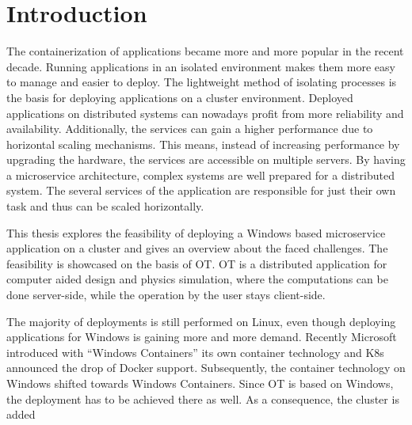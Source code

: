 


\chapter{Introduction} %

\label{chap:introd} %



The containerization of applications became more and more popular in the recent decade. Running applications in an isolated environment makes them more easy to manage and easier to deploy. The lightweight method of isolating processes is the basis for deploying applications on a cluster environment.
Deployed applications on distributed systems can nowadays profit from more reliability and availability. Additionally, the services can gain a higher performance due to horizontal scaling mechanisms. This means, instead of increasing performance by upgrading the hardware, the services are accessible on multiple servers.
By having a microservice architecture, complex systems are well prepared for a distributed system. The several services of the application are responsible for just their own task and thus can be scaled horizontally.

This thesis explores the feasibility of deploying a \ac{Windows} based microservice application on a cluster and gives an overview about the faced challenges. The feasibility is showcased on the basis of \ac{OT}. \ac{OT} is a distributed application for computer aided design and physics simulation, where the computations can be done server-side, while the operation by the user stays client-side.

The majority of deployments is still performed on Linux, even though deploying applications for \ac{Windows} is gaining more and more demand. Recently Microsoft introduced with \enquote{Windows Containers} its own container technology\cite{Microsoft.2022} and \ac{K8s} announced the drop of Docker support\cite{Kubernetes.2020}. Subsequently, the container technology on \ac{Windows} shifted towards Windows Containers.
Since \ac{OT} is based on \ac{Windows}, the deployment has to be achieved there as well. As a consequence, the cluster is added 


